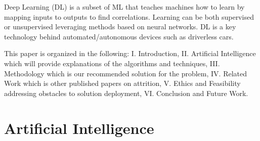 \documentclass{llncs}
\begin{document}
Deep Learning (DL) is a subset of ML that teaches machines how to learn by mapping inputs to outputs to find correlations. Learning can be both supervised or unsupervised leveraging methods based on neural networks. DL is a key technology behind automated/autonomous devices such as driverless cars.

This paper is organized in the following: I. Introduction, II. Artificial Intelligence which will provide explanations of the algorithms and techniques, III. Methodology which is our recommended solution for the problem, IV. Related Work which is other published papers on attrition, V. Ethics and Feasibility addressing obstacles to solution deployment, VI. Conclusion and Future Work.





\section{Artificial Intelligence}
\end{document}
